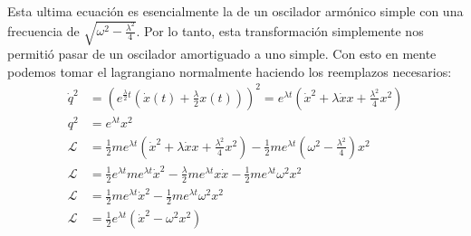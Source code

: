 \documentclass[12pt]{exam}
\begin{document}
Esta ultima ecuación es esencialmente la de un oscilador armónico simple con una frecuencia de $\sqrt{\omega^2 - \frac{\lambda^2}{4}} $. Por lo tanto, esta transformación simplemente nos permitió pasar de un oscilador amortiguado a uno simple. Con esto en mente podemos tomar el lagrangiano normalmente haciendo los reemplazos necesarios:
\begin{align*}
\dot{q}^2 &= \left( e^{\frac{\lambda}{2} t} \left( \dot{x}(t) + \frac{\lambda}{2} x(t) \right) \right)^2 = e^{\lambda t} \left( \dot{x}^2 + \lambda \dot{x} x + \frac{\lambda^2}{4} x^2 \right)\\
q^2 &= e^{\lambda t} x^2\\
\mathcal{L} &= \frac{1}{2} m e^{\lambda t} \left( \dot{x}^2 + \lambda \dot{x} x + \frac{\lambda^2}{4} x^2 \right) - \frac{1}{2} m e^{\lambda t} \left( \omega^2 - \frac{\lambda^2}{4} \right) x^2\\
\mathcal{L} &= \frac{1}{2} e^{\lambda t} m e^{\lambda t} \dot{x}^2 - \frac{\lambda}{2}m e^{\lambda t}x\dot{x} - \frac{1}{2}me^{\lambda t}\omega^2 x^2 \\
\mathcal{L} &= \frac{1}{2} m e^{\lambda t} \dot{x}^2 - \frac{1}{2} m e^{\lambda t} \omega^2 x^2\\
\mathcal{L} &= \frac{1}{2} e^{\lambda t} \left( \dot{x}^2 - \omega^2 x^2 \right)\\
\end{align*}
\end{document}
